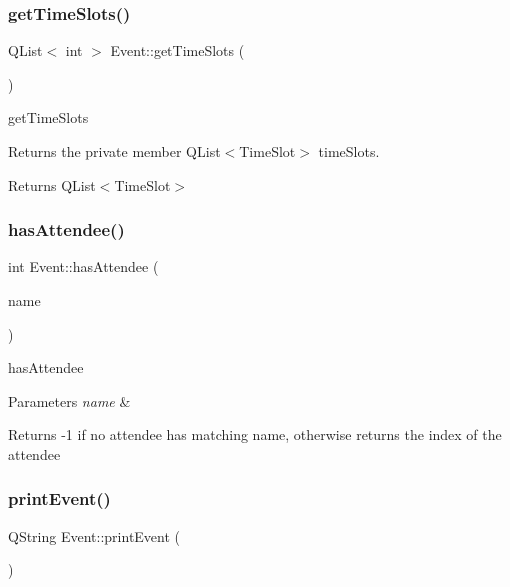 \subsubsection{\texorpdfstring{get\+Time\+Slots()}{getTimeSlots()}}
{\footnotesize\ttfamily Q\+List$<$ int $>$ Event\+::get\+Time\+Slots (\begin{DoxyParamCaption}{ }\end{DoxyParamCaption})}



get\+Time\+Slots 

Returns the private member Q\+List$<$\+Time\+Slot$>$ time\+Slots. \begin{DoxyReturn}{Returns}
Q\+List$<$\+Time\+Slot$>$ 
\end{DoxyReturn}
\mbox{\label{class_event_ac06e3e571247a3804491b14301b045d3}} 
\subsubsection{\texorpdfstring{has\+Attendee()}{hasAttendee()}}
{\footnotesize\ttfamily int Event\+::has\+Attendee (\begin{DoxyParamCaption}\item[{Q\+String}]{name }\end{DoxyParamCaption})}



has\+Attendee 


\begin{DoxyParams}{Parameters}
{\em name} & \\
\hline
\end{DoxyParams}
\begin{DoxyReturn}{Returns}
-\/1 if no attendee has matching name, otherwise returns the index of the attendee 
\end{DoxyReturn}
\mbox{\label{class_event_ab2c59affdf5f762ecedd77a689ba08de}} 
\subsubsection{\texorpdfstring{print\+Event()}{printEvent()}}
{\footnotesize\ttfamily Q\+String Event\+::print\+Event (\begin{DoxyParamCaption}{ }\end{DoxyParamCaption})}



